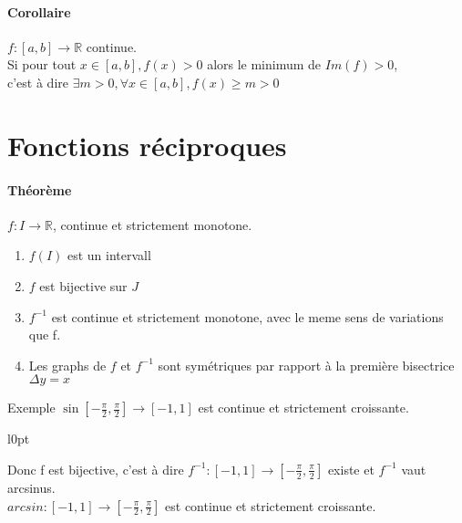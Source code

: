 \paragraph{Corollaire} $f : [a, b] \rightarrow \mathbb{R}$ continue. ~\\
Si pour tout $x \in [a, b], f(x) > 0$ alors le minimum de $Im(f) > 0$,~\\
c'est à dire $\exists m > 0, \forall x \in [a, b], f(x) \geq m > 0$

\section{Fonctions réciproques}

\paragraph{Théorème} $f : I \rightarrow \mathbb{R}$, continue et strictement monotone.
\begin{enumerate}
	\item $f(I)$ est un intervall
	\item $f$ est bijective sur $J$
	\item $f^{-1}$  est continue et strictement monotone, avec le meme sens de variations que f.
	\item Les graphs de $f$ et $f^{-1}$ sont symétriques par rapport à la première bisectrice $\Delta y=x$
\end{enumerate}

Exemple $\sin [-\frac{\pi}{2}, \frac{\pi}{2}] \rightarrow [-1, 1]$ est continue et strictement croissante.

\begin{wrapfigure}[3]{l}{0pt}
\end{wrapfigure}
Donc f est bijective, c'est à dire $f^{-1} : [-1, 1] \rightarrow [-\frac{\pi}{2}, \frac{\pi}{2}]$ existe et $f^{-1}$ vaut arcsinus. ~\\
$arcsin : [-1, 1] \rightarrow [-\frac{\pi}{2}, \frac{\pi}{2}]$ est continue et strictement croissante.

